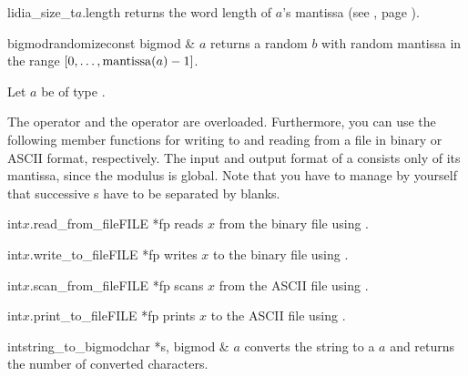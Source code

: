 \begin{cfcode}{lidia_size_t}{$a$.length}{}
  returns the word length of $a$'s mantissa (see , page \pageref{class:bigint}).
\end{cfcode}



\HIGH

\begin{fcode}{bigmod}{randomize}{const bigmod & $a$}
  returns a random  $b$ with random mantissa in the range $[0, \dots,
  \operatorname{mantissa}(a) - 1]$.
\end{fcode}



\IO

Let $a$ be of type .

The  operator \code{>>} and the  operator \code{<<} are overloaded.
Furthermore, you can use the following member functions for writing to and reading from a file
in binary or ASCII format, respectively.  The input and output format of a 
consists only of its mantissa, since the modulus is global.  Note that you have to manage by
yourself that successive s have to be separated by blanks.

\begin{fcode}{int}{$x$.read_from_file}{FILE *fp}
  reads $x$ from the binary file  using .
\end{fcode}

\begin{fcode}{int}{$x$.write_to_file}{FILE *fp}
  writes $x$ to the binary file  using .
\end{fcode}

\begin{fcode}{int}{$x$.scan_from_file}{FILE *fp}
  scans $x$ from the ASCII file  using .
\end{fcode}

\begin{fcode}{int}{$x$.print_to_file}{FILE *fp}
  prints $x$ to the ASCII file  using .
\end{fcode}

\begin{fcode}{int}{string_to_bigmod}{char *s, bigmod & $a$}
  converts the string  to a  $a$ and returns the number of converted
  characters.
\end{fcode}

